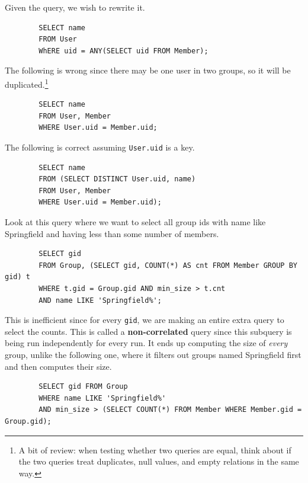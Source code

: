     \begin{example}
      Given the query, we wish to rewrite it. 
      \begin{lstlisting}
        SELECT name 
        FROM User 
        WhERE uid = ANY(SELECT uid FROM Member);
      \end{lstlisting}

      The following is wrong since there may be one user in two groups, so it will be duplicated.\footnote{A bit of review: when testing whether two queries are equal, think about if the two queries treat duplicates, null values, and empty relations in the same way. } 
      \begin{lstlisting}
        SELECT name 
        FROM User, Member 
        WHERE User.uid = Member.uid;
      \end{lstlisting} 

      The following is correct assuming \texttt{User.uid} is a key. 
      \begin{lstlisting}
        SELECT name 
        FROM (SELECT DISTINCT User.uid, name) 
        FROM User, Member 
        WHERE User.uid = Member.uid); 
      \end{lstlisting}
    \end{example}

    \begin{example}
      Look at this query where we want to select all group ids with name like Springfield and having less than some number of members. 
      \begin{lstlisting}
        SELECT gid 
        FROM Group, (SELECT gid, COUNT(*) AS cnt FROM Member GROUP BY gid) t 
        WHERE t.gid = Group.gid AND min_size > t.cnt 
        AND name LIKE 'Springfield%';
      \end{lstlisting}
      This is inefficient since for every \texttt{gid}, we are making an entire extra query to select the counts. This is called a \textbf{non-correlated} query since this subquery is being run independently for every run. It ends up computing the size of \textit{every} group, unlike the following one, where it filters out groups named Springfield first and then computes their size. 
      \begin{lstlisting}
        SELECT gid FROM Group 
        WHERE name LIKE 'Springfield%' 
        AND min_size > (SELECT COUNT(*) FROM Member WHERE Member.gid = Group.gid);
      \end{lstlisting}
    \end{example}

